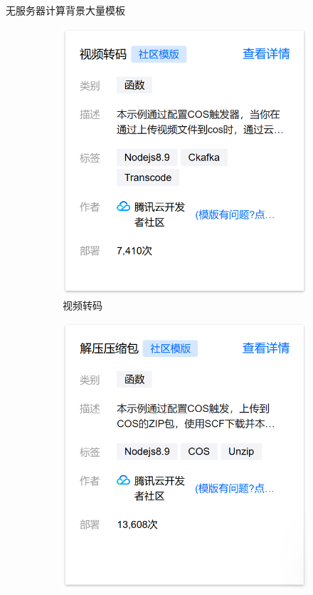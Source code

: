 \documentclass[aspectratio=169]{beamer}
\begin{document}
\begin{frame}{无服务器计算背景}{大量模板}
  \begin{figure}
    \begin{subfigure}{0.45\textwidth}
      \centering
      \includegraphics[height=0.7\textheight]{img/serverless-background/scf-template-1.png}
      \caption{视频转码}
    \end{subfigure}
    \begin{subfigure}{0.45\textwidth}
      \centering
      \includegraphics[height=0.7\textheight]{img/serverless-background/scf-template-2.png}

\end{subfigure}
\end{figure}
\end{frame}
\end{document}
